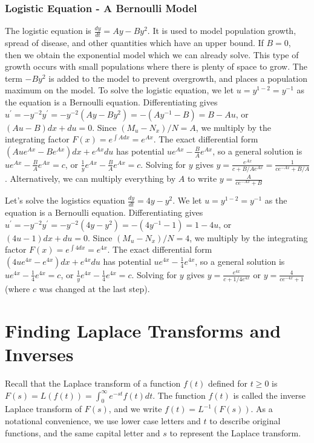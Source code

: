 \subsubsection{Logistic Equation - A Bernoulli Model}
The logistic equation is $\frac{dy}{dt}=Ay-By^2$. It is used to model population growth, spread of disease, and other quantities which have an upper bound. If $B=0$, then we obtain the exponential model which we can already solve. This type of growth occurs with small populations where there is plenty of space to grow.  The term $-By^2$ is added to the model to prevent overgrowth, and places a population maximum on the model.  To solve the logistic equation, we let $u=y^{1-2}=y^{-1}$ as the equation is a Bernoulli equation. Differentiating gives $u^\prime=-y^{-2}y^\prime = -y^{-2}(Ay-By^2) = -(Ay^{-1}-B) = B-Au$, or $(Au-B)dx+du=0$.  Since $(M_u-N_x)/N=A$, we multiply by the integrating factor $F(x)=e^{\int Adx}=e^{Ax}$. The exact differential form $(Aue^{Ax}-Be^{Ax})dx+e^{Ax}du$ has potential $ue^{Ax}-\frac{B}{A}e^{Ax}$, so a general solution is $ue^{Ax}-\frac{B}{A}e^{Ax}=c$, or $\frac{1}{y}e^{Ax}-\frac{B}{A}e^{Ax}=c$. Solving for $y$ gives $y=\frac{e^{Ax}}{c+B/A e^{Ax}} = \frac{1}{ce^{-Ax}+B/A}$. Alternatively, we can multiply everything by $A$ to write $y=\frac{A}{ce^{-Ax}+B}$ 

\begin{example}
Let's solve the logistics equation $\frac{dy}{dt}=4y-y^2$. 
We let $u=y^{1-2}=y^{-1}$ as the equation is a Bernoulli equation. Differentiating gives $u^\prime=-y^{-2}y^\prime = -y^{-2}(4y-y^2) = -(4y^{-1}-1) = 1-4u$, or $(4u-1)dx+du=0$.  Since $(M_u-N_x)/N=4$, we multiply by the integrating factor $F(x)=e^{\int 4dx}=e^{4x}$. The exact differential form $(4ue^{4x}-e^{4x})dx+e^{4x}du$ has potential $ue^{4x}-\frac{1}{4}e^{4x}$, so a general solution is $ue^{4x}-\frac{1}{4}e^{4x}=c$, or $\frac{1}{y}e^{4x}-\frac{1}{4}e^{4x}=c$. Solving for $y$ gives $y=\frac{e^{4x}}{c+1/4 e^{4x}}$ or $y = \frac{4}{ce^{-4x}+1}$ (where $c$ was changed at the last step). 

\end{example}










\section{Finding Laplace Transforms and Inverses}
Recall that the Laplace transform of a function $f(t)$ defined for $t\geq 0$ is $F(s)=L(f(t))=\int_0^\infty e^{-st}f(t)dt$. The function $f(t)$ is called the inverse Laplace transform of $F(s)$, and we write $f(t)=L^{-1}(F(s))$. As a notational convenience, we use lower case letters and $t$ to describe original functions, and the same capital letter and $s$ to represent the Laplace transform.

